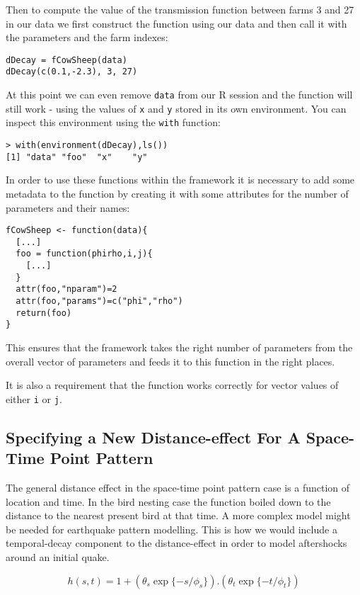 \documentclass{article}
\begin{document}
Then to compute the value of the transmission function between farms 3
and 27 in our data we first construct the function using our data and
then call it with the parameters and the farm indexes:

\begin{verbatim}
dDecay = fCowSheep(data)
dDecay(c(0.1,-2.3), 3, 27)
\end{verbatim}

At this point we can even remove {\tt data} from our R session and the function will still work - using the 
values of {\tt x} and {\tt y} stored in its own environment. You can inspect this environment using the {\tt with} function:

\begin{verbatim}
> with(environment(dDecay),ls())
[1] "data" "foo"  "x"    "y"   
\end{verbatim}

In order to use these functions within the framework it is necessary to add some metadata to the function
by creating it with some attributes for the number of parameters and their names:

\begin{verbatim}
fCowSheep <- function(data){
  [...]
  foo = function(phirho,i,j){
    [...]
  }
  attr(foo,"nparam")=2
  attr(foo,"params")=c("phi","rho")
  return(foo)
}
\end{verbatim}

This ensures that the framework takes the right number of parameters from the overall vector of parameters
and feeds it to this function in the right places.

It is also a requirement that the function works correctly for vector values of either \verb|i| or \verb|j|.


\subsection*{Specifying a New Distance-effect For A Space-Time Point Pattern}

The general distance effect in the space-time point pattern case is a function of location and time. In the bird
nesting case the function boiled down to the distance to the nearest present bird at that time. A more complex 
model might be needed for earthquake pattern modelling. This is how we would include a temporal-decay component
to the distance-effect in order to model aftershocks around an initial quake.


$$
h(s,t)=1 + (\theta_s \exp\{-s/\phi_s\}) . (\theta_t \exp\{-t/\phi_t\})
$$
\end{document}
